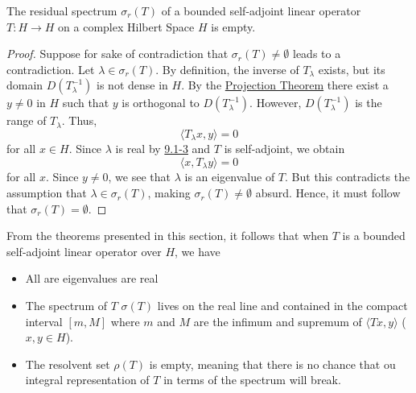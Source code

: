 \begin{theorem}
    The residual spectrum \( \sigma_r(T) \) of a bounded self-adjoint linear operator \( T: H \to H  \) on a complex Hilbert Space \( H  \) is empty. 
\end{theorem}
\begin{proof}
    Suppose for sake of contradiction that \( \sigma_r(T) \neq \emptyset \) leads to a contradiction. Let \( \lambda \in \sigma_r(T) \). By definition, the inverse of \( {T}_{\lambda} \) exists, but its domain \( D(T^{-1}_{\lambda}) \) is not dense in \( H  \). By the {\hyperref[Projection Theorem]{Projection Theorem}} there exist a \( y \neq 0  \) in \( H  \) such that \( y  \) is orthogonal to \( D({T}_{\lambda}^{-1}) \). However, \( D(T^{-1}_{\lambda}) \) is the range of \( {T}_{\lambda} \). Thus,  
    \[  \langle {T}_{\lambda} x  ,  y  \rangle = 0  \] 
    for all \( x \in H \). Since \( \lambda  \) is real by {\hyperref[9.1-3]{9.1-3}} and \( T  \) is self-adjoint, we obtain  
    \[  \langle x  ,  {T}_{\lambda}y  \rangle = 0  \]
    for all \( x  \). Since \( y \neq 0  \), we see that \( \lambda  \) is an eigenvalue of \( T  \). But this contradicts the assumption that \( \lambda \in {\sigma}_{r}(T) \), making \( \sigma_r(T) \neq \emptyset \) absurd. Hence, it must follow that \( \sigma_r(T) = \emptyset \).
\end{proof}

From the theorems presented in this section, it follows that when \( T  \) is a bounded self-adjoint linear operator over \( H  \), we have
\begin{itemize}
    \item All are eigenvalues are real 
    \item The spectrum of \( T  \) \( \sigma(T) \) lives on the real line and contained in the compact interval \( [m,M] \) where \( m  \) and \( M  \) are the infimum and supremum of \( \langle Tx , y \rangle \) (\( x,y \in H  \)).  
    \item The resolvent set \( \rho(T) \) is empty, meaning that there is no chance that ou integral representation of \( T  \) in terms of the spectrum will break.
\end{itemize}

